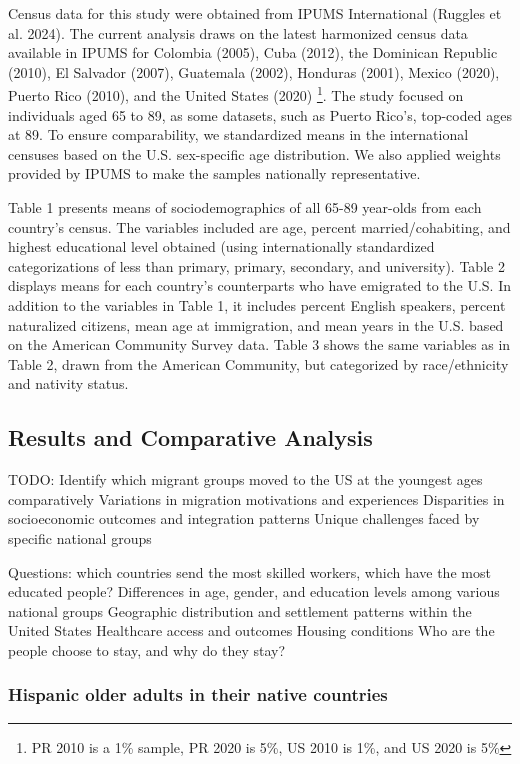 \documentclass[
]{article}
\begin{document}
Census data for this study were obtained from IPUMS International
(Ruggles et al. 2024). The current analysis draws on the latest
harmonized census data available in IPUMS for Colombia (2005), Cuba
(2012), the Dominican Republic (2010), El Salvador (2007), Guatemala
(2002), Honduras (2001), Mexico (2020), Puerto Rico (2010), and the
United States (2020) \footnote{PR 2010 is a 1\% sample, PR 2020 is 5\%,
  US 2010 is 1\%, and US 2020 is 5\%}. The study focused on individuals
aged 65 to 89, as some datasets, such as Puerto Rico's, top-coded ages
at 89. To ensure comparability, we standardized means in the
international censuses based on the U.S. sex-specific age distribution.
We also applied weights provided by IPUMS to make the samples nationally
representative.

Table 1 presents means of sociodemographics of all 65-89 year-olds from
each country's census. The variables included are age, percent
married/cohabiting, and highest educational level obtained (using
internationally standardized categorizations of less than primary,
primary, secondary, and university). Table 2 displays means for each
country's counterparts who have emigrated to the U.S. In addition to the
variables in Table 1, it includes percent English speakers, percent
naturalized citizens, mean age at immigration, and mean years in the
U.S. based on the American Community Survey data. Table 3 shows the same
variables as in Table 2, drawn from the American Community, but
categorized by race/ethnicity and nativity status.

\subsection{Results and Comparative Analysis}\label{sec-results}

TODO: Identify which migrant groups moved to the US at the youngest ages
comparatively Variations in migration motivations and experiences
Disparities in socioeconomic outcomes and integration patterns Unique
challenges faced by specific national groups

Questions: which countries send the most skilled workers, which have the
most educated people? Differences in age, gender, and education levels
among various national groups Geographic distribution and settlement
patterns within the United States Healthcare access and outcomes Housing
conditions Who are the people choose to stay, and why do they stay?

\subsubsection{Hispanic older adults in their native
countries}\label{hispanic-older-adults-in-their-native-countries}
\end{document}
